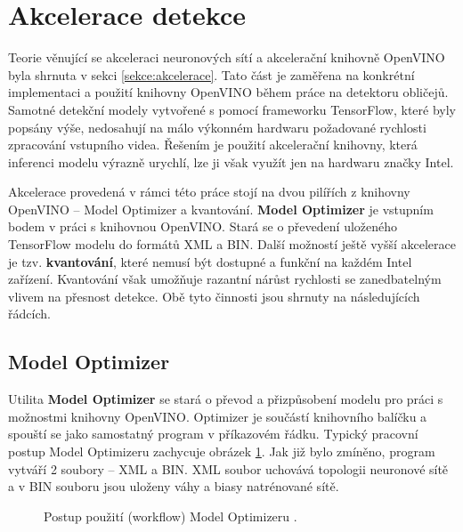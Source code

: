 \section{Akcelerace detekce}
\label{sekce:akcelerace_implementace}
Teorie věnující se akceleraci neuronových sítí a akcelerační knihovně OpenVINO byla shrnuta v sekci \ref{sekce:akcelerace}. Tato část je zaměřena na konkrétní implementaci a použití knihovny OpenVINO během práce na detektoru obličejů. Samotné detekční modely vytvořené s pomocí frameworku TensorFlow, které byly popsány výše, nedosahují na málo výkonném hardwaru požadované rychlosti zpracování vstupního videa. Řešením je použití akcelerační knihovny, která inferenci modelu výrazně urychlí, lze ji však využít jen na hardwaru značky Intel.

Akcelerace provedená v rámci této práce stojí na dvou pilířích z knihovny OpenVINO -- Model Optimizer a kvantování. \textbf{Model Optimizer} je vstupním bodem v práci s knihovnou OpenVINO. Stará se o převedení uloženého TensorFlow modelu do formátů XML a BIN. Další možností ještě vyšší akcelerace je tzv. \textbf{kvantování}, které nemusí být dostupné a funkční na každém Intel zařízení. Kvantování však umožňuje razantní nárůst rychlosti se zanedbatelným vlivem na přesnost detekce. Obě tyto činnosti jsou shrnuty na následujících řádcích.

\subsection*{Model Optimizer}
Utilita \textbf{Model Optimizer}\cite{modeloptimizer} se stará o převod a přizpůsobení modelu pro práci s možnostmi knihovny OpenVINO. Optimizer je součástí knihovního balíčku a spouští se jako samostatný program v příkazovém řádku. Typický pracovní postup Model Optimizeru zachycuje obrázek \ref{obrazek:moworkflow}. Jak již bylo zmíněno, program vytváří 2 soubory -- XML a BIN. XML soubor uchovává topologii neuronové sítě a v BIN souboru jsou uloženy váhy a biasy natrénované sítě.

\begin{figure}[H]
  \begin{center}
  \label{obrazek:moworkflow}
  \caption[]{Postup použití (workflow) Model Optimizeru \cite{modeloptimizer}.}
  \end{center}
\end{figure}

